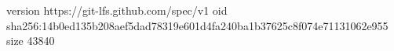 version https://git-lfs.github.com/spec/v1
oid sha256:14b0ed135b208aef5dad78319e601d4fa240ba1b37625c8f074e71131062e955
size 43840
